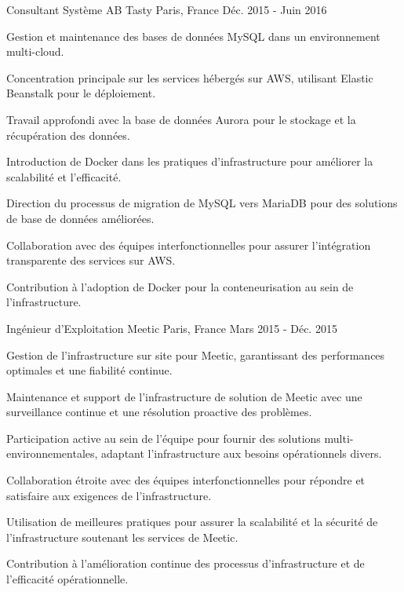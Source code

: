 \begin{cventries}
\cventry
{Consultant Système} %
{AB Tasty} %
{Paris, France} %
{Déc. 2015 - Juin 2016} %
{
  \begin{cvitems} %
    \item {Gestion et maintenance des bases de données MySQL dans un environnement multi-cloud.}
    \item {Concentration principale sur les services hébergés sur AWS, utilisant Elastic Beanstalk pour le déploiement.}
    \item {Travail approfondi avec la base de données Aurora pour le stockage et la récupération des données.}
    \item {Introduction de Docker dans les pratiques d'infrastructure pour améliorer la scalabilité et l'efficacité.}
    \item {Direction du processus de migration de MySQL vers MariaDB pour des solutions de base de données améliorées.}
    \item {Collaboration avec des équipes interfonctionnelles pour assurer l'intégration transparente des services sur AWS.}
    \item {Contribution à l'adoption de Docker pour la conteneurisation au sein de l'infrastructure.}
  \end{cvitems}
}

\cventry
{Ingénieur d'Exploitation} %
{Meetic} %
{Paris, France} %
{Mars 2015 - Déc. 2015} %
{
  \begin{cvitems} %
    \item {Gestion de l'infrastructure sur site pour Meetic, garantissant des performances optimales et une fiabilité continue.}
    \item {Maintenance et support de l'infrastructure de solution de Meetic avec une surveillance continue et une résolution proactive des problèmes.}
    \item {Participation active au sein de l'équipe pour fournir des solutions multi-environnementales, adaptant l'infrastructure aux besoins opérationnels divers.}
    \item {Collaboration étroite avec des équipes interfonctionnelles pour répondre et satisfaire aux exigences de l'infrastructure.}
    \item {Utilisation de meilleures pratiques pour assurer la scalabilité et la sécurité de l'infrastructure soutenant les services de Meetic.}
    \item {Contribution à l'amélioration continue des processus d'infrastructure et de l'efficacité opérationnelle.}
  \end{cvitems}
}

\end{cventries}

